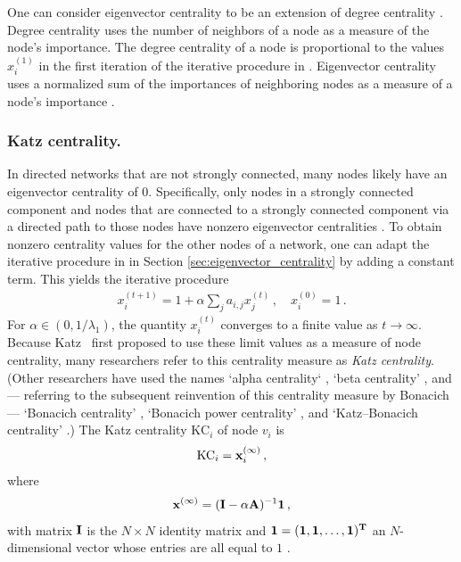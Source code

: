 \documentclass{comnet-mod}
\begin{document}
One can consider eigenvector centrality to be an extension of degree centrality \cite[p.\,330]{Newman2018}. Degree centrality uses the number of neighbors of a node as a measure of the node's importance. The degree centrality of a node is proportional to the values $x_i^{(1)}$ in the first iteration of the iterative procedure in . Eigenvector centrality uses a normalized sum of the importances of neighboring nodes as a measure of a node's importance \cite{Bonacich1972}. 


\subsubsection{Katz centrality.}\label{sec:Katz}

In directed networks that are not strongly connected, many nodes likely have an eigenvector centrality of 0. Specifically, only nodes in a strongly connected component and nodes that are connected to a strongly connected component via a directed path to those nodes have nonzero eigenvector centralities \cite[p.\,163]{Newman2018}.
To obtain nonzero centrality values for the other nodes of a network, one can adapt the iterative procedure in  in Section \ref{sec:eigenvector_centrality} by adding a constant term. This yields the iterative procedure
\begin{align}
	x_i^{(t+1)} = 1 + \alpha\sum_j a_{i,j}{x_j^{(t)}}\,, \quad x_i^{(0)} = 1\,.\label{eq:katz}
\end{align}
For $\alpha\in(0,1/\lambda_1)$, the quantity $x_i^{(t)}$ converges to a finite value as $t \rightarrow \infty$. Because Katz~\cite{Katz1953} first proposed to use these limit values as a measure of node centrality, many researchers refer to this centrality measure as \textit{Katz centrality}. (Other researchers have used the names `alpha centrality` \cite{Ghosh2011, Ide2013}, `beta centrality' \cite{Soheili2014, Jennings2019}, and --- referring to the subsequent reinvention of this centrality measure by Bonacich \cite{Bonacich1987} --- `Bonacich centrality' \cite{Mizruchi1981, Ballester2006, Fujiyama2020}, `Bonacich power centrality' \cite{Smith2014, Koufteros2021}, and `Katz--Bonacich centrality' \cite{Matveenko2019, Dasaratha2020, Bloch2023}.)
The Katz centrality $\textrm{KC}_i$ of node $v_i$ is
\begin{align}
	\textrm{KC}_i = {\bf x}^{(\infty)}_i\,,\nonumber
\end{align}
where 
\begin{align}
	{\bf x}^{(\infty)} = ({\bf I}-\alpha{\bf A})^{-1}{\bf 1} \,,\nonumber
\end{align}
with matrix $\bf I$ is the $N\times N$ identity matrix and $\bf 1 = (1,1,\ldots,1)^T$ an $N$-dimensional vector whose entries are all equal to $1$ \cite[p.\,163]{Newman2018}. 
\end{document}

